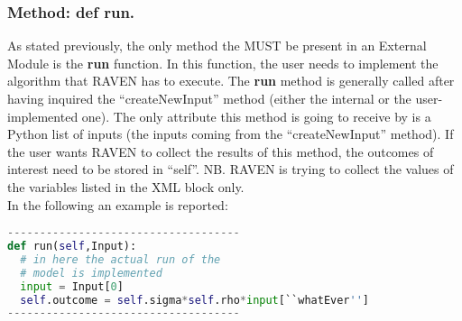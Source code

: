 \subsubsection{Method: def run.}
\label{subsubsec:externalRun}
As stated previously, the only method the MUST be present in an External Module
is the \textbf{run} function.
%
In this function, the user needs to implement the algorithm that RAVEN has to
execute.
%
The \textbf{run} method is generally called after having inquired the
``createNewInput'' method (either the internal or the user-implemented one).
%
The only attribute this method is going to receive by is a Python list of inputs
(the inputs coming from the ``createNewInput'' method).
%
If the user wants RAVEN to collect the results of this method, the outcomes of
interest need to be stored in ``self''.
%
NB.
%
RAVEN is trying to collect the values of the variables listed in the XML block
 only.
%
\\In the following an example is reported:

\begin{lstlisting}[language=python]
------------------------------------
def run(self,Input):
  # in here the actual run of the
  # model is implemented
  input = Input[0]
  self.outcome = self.sigma*self.rho*input[``whatEver'']
------------------------------------
\end{lstlisting}

%


